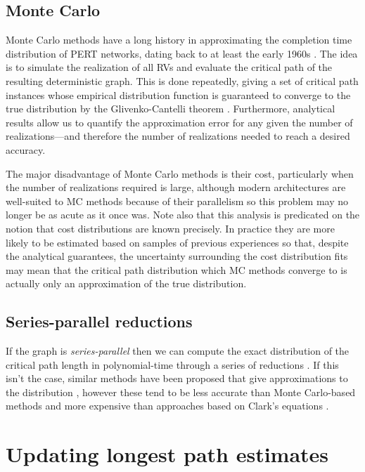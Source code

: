 \documentclass[12pt]{article}
\begin{document}
\subsection{Monte Carlo}
\label{subsect.stochastic_monte_carlo}

Monte Carlo methods have a long history in approximating the completion time distribution of PERT networks, dating back to at least the early 1960s \cite{van63}. The idea is to simulate the realization of all RVs and evaluate the critical path of the resulting deterministic graph. This is done repeatedly, giving a set of critical path instances whose empirical distribution function is guaranteed to converge to the true distribution by the Glivenko-Cantelli theorem \cite{can16}. Furthermore, analytical results allow us to quantify the approximation error for any given the number of realizations---and therefore the number of realizations needed to reach a desired accuracy.

The major disadvantage of Monte Carlo methods is their cost, particularly when the number of realizations required is large, although modern architectures are well-suited to MC methods because of their parallelism so this problem may no longer be as acute as it once was. Note also that this analysis is predicated on the notion that cost distributions are known precisely. In practice they are more likely to be estimated based on samples of previous experiences so that, despite the analytical guarantees, the uncertainty surrounding the cost distribution fits may mean that the critical path distribution which MC methods converge to is actually only an approximation of the true distribution. 

\subsection{Series-parallel reductions}
\label{subsect.stochastic_series_parallel} 

If the graph is {\em series-parallel} then we can compute the exact distribution of the critical path length in polynomial-time through a series of reductions \cite{dod85,mar65}. If this isn't the case, similar methods have been proposed that give approximations to the distribution \cite{dod85,lud01}, however these tend to be less accurate than Monte Carlo-based methods and more expensive than approaches based on Clark's equations \cite{can16}. 

\section{Updating longest path estimates}
\label{sect.other_updating}
\end{document}
